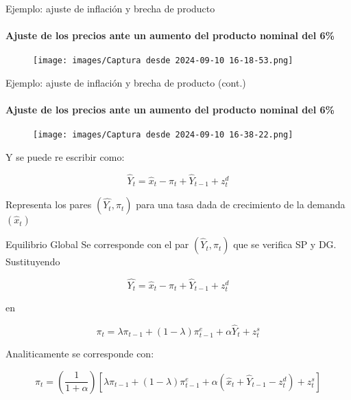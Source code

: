 \documentclass[11pt]{beamer}
\begin{document}
\begin{frame}{Ejemplo: ajuste de inflación y brecha de producto}
\framesubtitle{Ajuste de los precios ante un aumento del producto nominal del 6\%}
    \begin{figure}
        \centering
        \texttt{[image: images/Captura desde 2024-09-10 16-18-53.png]}
        \label{fig:enter-label}
    \end{figure}
\end{frame}


\begin{frame}{Ejemplo: ajuste de inflación y brecha de producto (cont.)}
\framesubtitle{Ajuste de los precios ante un aumento del producto nominal del 6\%}
\begin{figure}
    \centering
    \texttt{[image: images/Captura desde 2024-09-10 16-38-22.png]}
    \label{fig:enter-label}
\end{figure}
\end{frame}
\begin{frame}
Y se puede re escribir como:


\begin{equation*}
\widehat{Y}_{t}=\widehat{x}_{t}-\pi_{t}+\widehat{Y}_{t-1}+z_{t}^{d} \tag{4}
\end{equation*}


Representa los pares $\left(\widehat{Y_{t}}, \pi_{t}\right)$ para una tasa dada de crecimiento de la demanda $\left(\widehat{x}_{t}\right)$		
		

		
\end{frame}		

		
\begin{frame}{Equilibrio Global}
	Se corresponde con el par $\left(\widehat{Y}_{t}, \pi_{t}\right)$ que se verifica SP y DG.\\
	Sustituyendo
	
	$$
	\widehat{Y_{t}}=\widehat{x}_{t}-\pi_{t}+\widehat{Y}_{t-1}+z_{t}^{d}
	$$
	
	en
	
	$$
	\pi_{t}=\lambda \pi_{t-1}+(1-\lambda) \pi_{t-1}^{e}+\alpha \widehat{Y}_{t}+z_{t}^{s}
	$$
	
	Analiticamente se corresponde con:
	
	
	\begin{equation*}
		\pi_{t}=\left(\frac{1}{1+\alpha}\right)\left[\lambda \pi_{t-1}+(1-\lambda) \pi_{t-1}^{e}+\alpha\left(\widehat{x}_{t}+\widehat{Y}_{t-1}-z_{t}^{d}\right)+z_{t}^{s}\right] \tag{5}
	\end{equation*}
	

\end{frame}
\end{document}
